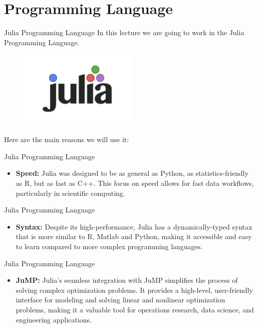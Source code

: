 \documentclass[aspectratio=1610,12pt]{beamer}
\begin{document}
\section{Programming Language}

\begin{frame}{Julia Programming Language}
\label{pic_julia}
	\center In this lecture we are going to work in the Julia Programming Language.
	\center \begin{figure}
		 \includegraphics[width=0.5\textwidth]{images/julia-programming-language.png}
	\end{figure}
	Here are the main reasons we will use it:
\end{frame}

\begin{frame}{Julia Programming Language}
	\begin{itemize}
   		\item \textbf{Speed:} Julia was designed to be as general as Python, as statistics-friendly as R, but as fast as C++. This focus on speed allows for fast data workflows, particularly in scientific computing.
	\end{itemize}
\end{frame}

\begin{frame}{Julia Programming Language}
	\begin{itemize}
        \item \textbf{Syntax:} Despite its high-performance, Julia has a dynamically-typed syntax that is more similar to R, Matlab and Python, making it accessible and easy to learn compared to more complex programming languages.
	\end{itemize}
\end{frame}

\begin{frame}{Julia Programming Language}
	\begin{itemize}
           \item \textbf{JuMP:} Julia's seamless integration with JuMP simplifies the process of solving complex optimization problems. It provides a high-level, user-friendly interface for modeling and solving linear and nonlinear optimization problems, making it a valuable tool for operations research, data science, and engineering applications.        
	\end{itemize}
\end{frame}
\end{document}
